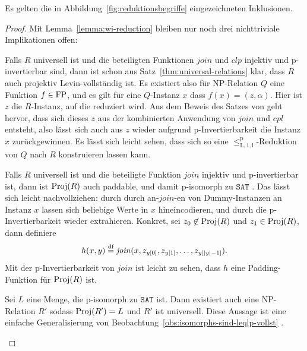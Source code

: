 \begin{lemma}
    Es gelten die in Abbildung~\ref{fig:reduktionsbegriffe} eingezeichneten Inklusionen.
\end{lemma}
\begin{proof}
    Mit Lemma~\ref{lemma:wi-reduction} bleiben nur noch drei nichttriviale Implikationen offen:
    \begin{prooflist}
        \item Falls $R$ universell ist und die beteiligten Funktionen $\mathit{join}$ und $\mathit{clp}$ injektiv und p-invertierbar sind, dann ist schon aus Satz~\ref{thm:universal-relations} klar, dass $R$ auch projektiv Levin-vollständig ist.
            Es existiert also für NP-Relation $Q$ eine Funktion $f\in\mathrm{FP}$, und es gilt für eine $Q$-Instanz $x$ dass $f(x)=(z,\alpha)$. Hier ist $z$ die $R$-Instanz, auf die reduziert wird.
            Aus dem Beweis des Satzes von \textcite{agrawal_universal_1992} geht hervor, dass sich dieses $z$ aus der kombinierten Anwendung von $\mathit{join}$ und $\mathit{cpl}$ entsteht, also lässt sich auch aus $z$ wieder aufgrund p-Invertierbarkeit die Instanz $x$ zurückgewinnen.
            Es lässt sich leicht sehen, dass sich so eine $\leq_\mathrm{L,1,i}^\mathrm p$-Reduktion von $Q$ nach $R$ konstruieren lassen kann.
        \item  Falls $R$ universell ist und die beteiligte Funktion $\mathit{join}$ injektiv und p-invertierbar ist, dann ist $\operatorname{Proj}(R)$ auch paddable, und damit p-isomorph zu $\mathtt{SAT}$ \parencite[Thm.~8.2]{agrawal_universal_1992}. Das lässt sich leicht nachvollziehen: durch  durch an-$\mathit{join}$-en von Dummy-Instanzen an Instanz $x$ lassen sich beliebige Werte in $x$ hineincodieren, und durch die p-Invertierbarkeit wieder extrahieren.
            Konkret, sei $z_0\not\in\operatorname{Proj}(R)$ und $z_1\in\operatorname{Proj}(R)$, dann definiere
            \[ h(x,y)\stackrel{\text{df}}{=} \mathit{join}(x, z_{y[0]}, z_{y[1]}, \ldots, z_{y[|y|-1]}). \]
            Mit der p-Invertierbarkeit von $\mathit{join}$ ist leicht zu sehen, dass $h$ eine Padding-Funktion für $\operatorname{Proj}(R)$ ist.
    \item Sei $L$ eine Menge, die p-isomorph zu $\mathtt{SAT}$ ist. Dann existiert auch eine NP-Relation $R'$ sodass $\operatorname{Proj}(R')=L$ und $R'$ ist universell. Diese Aussage ist eine einfache Generalisierung von Beobachtung~\ref{obs:isomorphs-sind-leqlp-vollst} \parencite[vgl.][Prop.~8.5]{agrawal_universal_1992}.
    \end{prooflist}
\end{proof}

